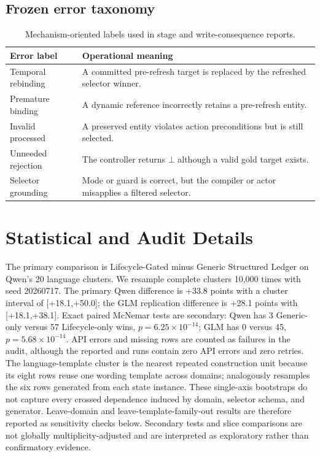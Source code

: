 \documentclass[10pt]{article}
\begin{document}
\subsection{Frozen error taxonomy}
\begin{table}[h]
\centering
\small
\setlength{\tabcolsep}{4pt}
\begin{tabular}{p{}p{}}
\toprule
Error label & Operational meaning \\
\midrule
Temporal rebinding & A committed pre-refresh target is replaced by the refreshed selector winner. \\
Premature binding & A dynamic reference incorrectly retains a pre-refresh entity. \\
Invalid processed & A preserved entity violates action preconditions but is still selected. \\
Unneeded rejection & The controller returns $\bot$ although a valid gold target exists. \\
Selector grounding & Mode or guard is correct, but the compiler or actor misapplies a filtered selector. \\
\bottomrule
\end{tabular}
\caption{Mechanism-oriented labels used in stage and write-consequence reports.}
\label{tab:supp-errors}
\end{table}

\section{Statistical and Audit Details}
The primary comparison is Lifecycle-Gated minus Generic Structured Ledger on Qwen's 20
language clusters. We resample complete clusters 10,000 times with seed 20260717. The
primary Qwen difference is +33.8 points with a cluster interval of [+18.1,+50.0]; the GLM
replication difference is +28.1 points with [+18.1,+38.1]. Exact paired McNemar tests are
secondary: Qwen has 3 Generic-only versus 57 Lifecycle-only wins, $p=6.25\times10^{-14}$;
GLM has 0 versus 45, $p=5.68\times10^{-14}$. API errors and missing rows are counted as
failures in the audit, although the reported \PrimaryDiagnostic{} and \GuardedExtension{} runs contain zero API errors
and zero retries. The \PrimaryDiagnostic{} language-template cluster is the nearest repeated construction unit
because its eight rows reuse one wording template across domains; \NewSchemaReplication{} analogously resamples the
six rows generated from each state instance. These single-axis bootstraps do not capture every
crossed dependence induced by domain, selector schema, and generator. Leave-domain and
leave-template-family-out results are therefore reported as sensitivity checks below. Secondary
tests and slice comparisons are not globally multiplicity-adjusted and are interpreted as
exploratory rather than confirmatory evidence.
\end{document}

